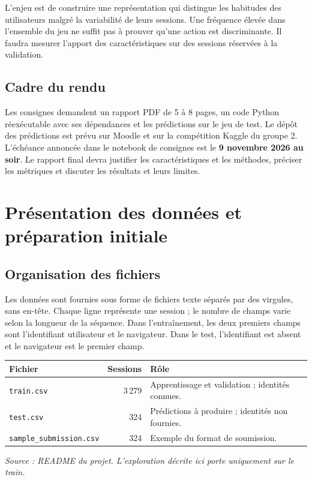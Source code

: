 \documentclass[10pt,a4paper]{article}
\begin{document}
L'enjeu est de construire une représentation qui distingue les habitudes
des utilisateurs malgré la variabilité de leurs sessions. Une fréquence
élevée dans l'ensemble du jeu ne suffit pas à prouver qu'une action est
discriminante. Il faudra mesurer l'apport des caractéristiques sur des
sessions réservées à la validation.

\subsection{Cadre du rendu}
Les consignes demandent un rapport PDF de 5 à 8 pages, un code Python
réexécutable avec ses dépendances et les prédictions sur le jeu de test.
Le dépôt des prédictions est prévu sur Moodle et sur la compétition Kaggle
du groupe 2. L'échéance annoncée dans le notebook de consignes est le
\textbf{9 novembre 2026 au soir}. Le rapport final devra justifier les
caractéristiques et les méthodes, préciser les métriques et discuter les
résultats et leurs limites.

\newpage
\section{Présentation des données et préparation initiale}
\subsection{Organisation des fichiers}
Les données sont fournies sous forme de fichiers texte séparés par des
virgules, sans en-tête. Chaque ligne représente une session ; le nombre
de champs varie selon la longueur de la séquence. Dans l'entraînement,
les deux premiers champs sont l'identifiant utilisateur et le navigateur.
Dans le test, l'identifiant est absent et le navigateur est le premier champ.

\begin{center}
\begin{tabularx}{\linewidth}{l r Y}
\toprule
Fichier & Sessions & Rôle \\
\midrule
\texttt{train.csv} & 3\,279 & Apprentissage et validation ; identités connues. \\
\texttt{test.csv} & 324 & Prédictions à produire ; identités non fournies. \\
\texttt{sample\_submission.csv} & 324 & Exemple du format de soumission. \\
\bottomrule
\end{tabularx}
\end{center}
\textit{Source : README du projet. L'exploration décrite ici porte uniquement sur le train.}
\end{document}
